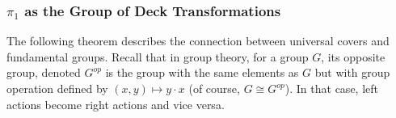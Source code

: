 \documentclass{article}
\theoremstyle{plain}
\newtheorem{proposition}[theorem]{Proposition}
\theoremstyle{definition}
\DeclareMathOperator{\Fib}{Fib}
\begin{document}

 


\subsubsection{$\pi_1$ as the Group of Deck Transformations} 

\noindent The following theorem describes the connection between universal covers and fundamental groups.
Recall that in group theory, for a group $G$, its opposite group, denoted $G^{op}$ is the group with the same elements as $G$ but with group operation defined by $(x,y)\mapsto y\cdot x$ (of course, $G\cong G^{op}$). In that case, left actions become right actions and vice versa.
\end{document}
